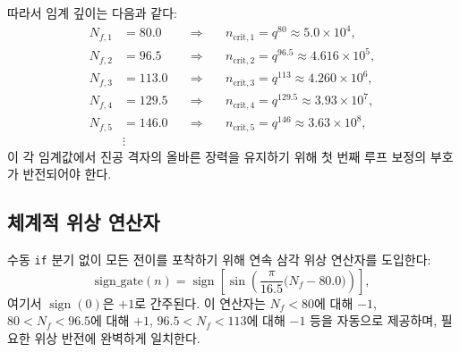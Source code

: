 \documentclass[11pt,a4paper]{article}
\begin{document}
	따라서 임계 깊이는 다음과 같다:
	\begin{align}
		N_{f,1} &= 80.0 \quad &\Longrightarrow&\quad n_{\mathrm{crit},1} = q^{80} \approx 5.0\times10^4, \\
		N_{f,2} &= 96.5 \quad &\Longrightarrow&\quad n_{\mathrm{crit},2} = q^{96.5} \approx 4.616\times10^5, \\
		N_{f,3} &= 113.0 \quad &\Longrightarrow&\quad n_{\mathrm{crit},3} = q^{113} \approx 4.260\times10^6, \\
		N_{f,4} &= 129.5 \quad &\Longrightarrow&\quad n_{\mathrm{crit},4} = q^{129.5} \approx 3.93\times10^7, \\
		N_{f,5} &= 146.0 \quad &\Longrightarrow&\quad n_{\mathrm{crit},5} = q^{146} \approx 3.63\times10^8, \\
		&\vdots & &
	\end{align}
	이 각 임계값에서 진공 격자의 올바른 장력을 유지하기 위해 첫 번째 루프 보정의 부호가 반전되어야 한다.
	
	\subsection{체계적 위상 연산자}
	수동 \texttt{if} 분기 없이 모든 전이를 포착하기 위해 연속 삼각 위상 연산자를 도입한다:
	\begin{equation}
		\boxed{\mathrm{sign\_gate}(n) = \operatorname{sign}\!\left[\sin\!\left(\frac{\pi}{16.5}\bigl(N_f - 80.0\bigr)\right)\right]},
		\label{eq:phaseoperator}
	\end{equation}
	여기서 \(\operatorname{sign}(0)\)은 \(+1\)로 간주된다. 이 연산자는 \(N_f<80\)에 대해 \(-1\), \(80 < N_f < 96.5\)에 대해 \(+1\), \(96.5 < N_f < 113\)에 대해 \(-1\) 등을 자동으로 제공하며, 필요한 위상 반전에 완벽하게 일치한다.
	
\end{document}
